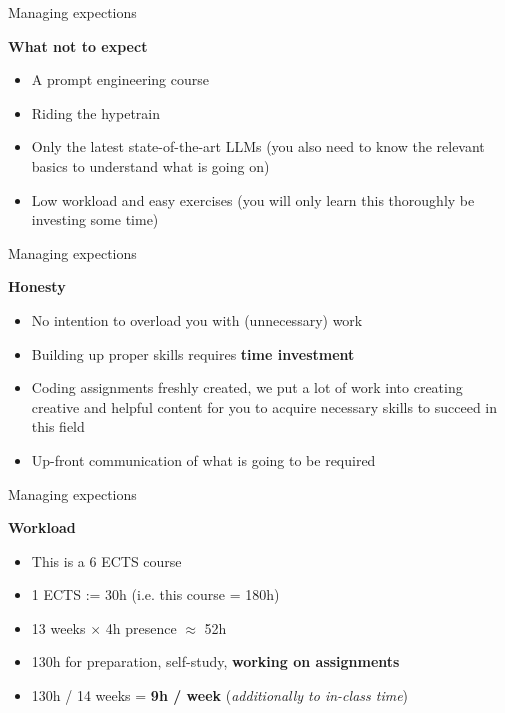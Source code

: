\documentclass[11pt,compress,t,notes=noshow, xcolor=table]{beamer}
\begin{document}

\begin{frame}{Managing expections}

\vfill

\textbf{What not to expect}

	\begin{itemize}
		\item A prompt engineering course
		\item Riding the hypetrain
		\item Only the latest state-of-the-art LLMs (you also need to know the relevant basics to understand what is going on)
		\item Low workload and easy exercises (you will only learn this thoroughly be investing some time)
	\end{itemize}

\vfill

\end{frame}


\begin{frame}{Managing expections}

\vfill

\textbf{Honesty}

	\begin{itemize}
		\item No intention to overload you with (unnecessary) work
		\item Building up proper skills requires \textbf{time investment}
		\item Coding assignments freshly created, we put a lot of work into creating creative and helpful content for you to acquire necessary skills to succeed in this field
		\item Up-front communication of what is going to be required
	\end{itemize}
\vfill

\end{frame}


\begin{frame}{Managing expections}

\vfill

\textbf{Workload}

	\begin{itemize}
		\item This is a 6 ECTS course
		\item 1 ECTS := 30h (i.e. this course = 180h)
		\item 13 weeks $\times$ 4h presence $\approx$ 52h
		\item 130h for preparation, self-study, \textbf{working on assignments} 
		\item 130h / 14 weeks = \textbf{9h / week} (\textit{additionally to in-class time})
	\end{itemize}


\vfill

\end{frame}
\end{document}
